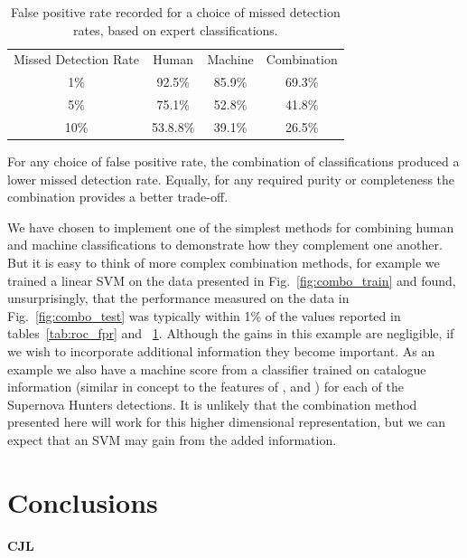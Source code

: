 \documentclass[a4paper,fleqn,usenatbib]{mnras}
\begin{document}
\begin{table}
\begin{tabular}{|c|c|c|c|}
Missed Detection Rate & Human & Machine & Combination\\
1\% & 92.5\% & 85.9\% & 69.3\% \\
5\% & 75.1\% & 52.8\% & 41.8\% \\
10\% & 53.8.8\% & 39.1\% & 26.5\% \\
\end{tabular}
\caption{False positive rate recorded for a choice of missed detection rates, based on expert classifications.
}\label{tab:roc_mdr}
\end{table}

For any choice of false positive rate, the combination of classifications produced a lower missed detection rate. Equally, for any required purity or completeness the combination provides a better trade-off. 

We have chosen to implement one of the simplest methods for combining human and machine classifications to demonstrate how they complement one another.  But it is easy to think of more complex combination methods, for example we trained a linear SVM on the data presented in Fig.~\ref{fig:combo_train} and found, unsurprisingly, that the performance measured on the data in Fig.~\ref{fig:combo_test} was typically within 1\% of the values reported in tables~\ref{tab:roc_fpr} and ~\ref{tab:roc_mdr}.  Although the gains in this example are negligible, if we wish to incorporate additional information they become important.  As an example we also have a machine score from a classifier trained on catalogue information (similar in concept to the features of \citet{Bloom12}, \citet{Brink13} and \citet{Goldstein15}) for each of the Supernova Hunters detections.  It is unlikely that the combination method presented here will work for this higher dimensional representation, but we can expect that an SVM may gain from the added information.

\section{Conclusions}
\label{sec:conclusions}
\textbf{CJL}
\end{document}

